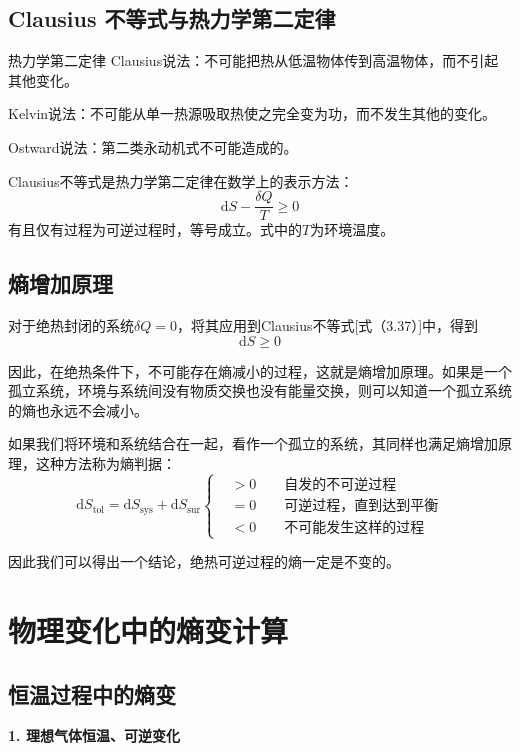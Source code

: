 \documentclass[lang=cn,newtx,10pt,scheme=chinese]{elegantbook}
\begin{document}
\subsection{Clausius 不等式与热力学第二定律}
\begin{theorem}{热力学第二定律}
	Clausius说法：不可能把热从低温物体传到高温物体，而不引起其他变化。
	
	Kelvin说法：不可能从单一热源吸取热使之完全变为功，而不发生其他的变化。
	
	Ostward说法：第二类永动机式不可能造成的。
\end{theorem}

Clausius不等式是热力学第二定律在数学上的表示方法：
\begin{equation}
	\mathrm{d}S-\frac{\delta Q}{T}\geqslant 0 
\end{equation}
有且仅有过程为可逆过程时，等号成立。式中的$T$为环境温度。

\subsection{熵增加原理}
对于绝热封闭的系统$\delta Q=0$，将其应用到Clausius不等式[式（3.37）]中，得到
\begin{equation}
	\mathrm{d}S \geqslant 0
\end{equation}

因此，在绝热条件下，不可能存在熵减小的过程，这就是熵增加原理。如果是一个孤立系统，环境与系统间没有物质交换也没有能量交换，则可以知道一个孤立系统的熵也永远不会减小。

如果我们将环境和系统结合在一起，看作一个孤立的系统，其同样也满足熵增加原理，这种方法称为熵判据：
\begin{equation}
	\mathrm{d}S_{\mathrm{tol}} = \mathrm{d}S_{\mathrm{sys}} + \mathrm{d}S_{\mathrm{sur}} \left\{
	\begin{aligned}
		&> 0 \qquad \text{自发的不可逆过程} \\
		&= 0 \qquad \text{可逆过程，直到达到平衡}\\
		&< 0 \qquad \text{不可能发生这样的过程} 
	\end{aligned}
\right.
\end{equation}

因此我们可以得出一个结论，绝热可逆过程的熵一定是不变的。

\section{物理变化中的熵变计算}

\subsection{恒温过程中的熵变}
\textbf{1. 理想气体恒温、可逆变化}
\end{document}
